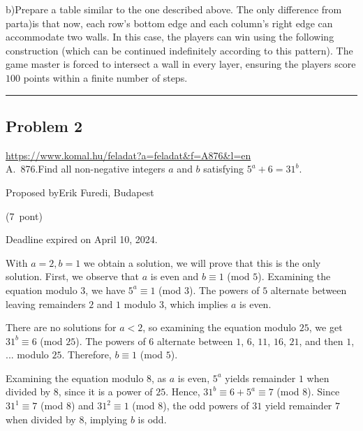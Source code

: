 \documentclass{article}
\begin{document}
b)Prepare a table similar to the one described above. The only difference from parta)is that now, each row's bottom edge and each column's right edge can accommodate two walls. In this case, the players can win using the following construction (which can be continued indefinitely according to this pattern). The game master is forced to intersect a wall in every layer, ensuring the players score \(\displaystyle 100\) points within a finite number of steps.

\vspace{1em}
\hrule
\vspace{1em}

\subsection*{Problem 2}
\noindent\url{https://www.komal.hu/feladat?a=feladat&f=A876&l=en}\\[1em]

A. 876.Find all non-negative integers \(\displaystyle a\) and \(\displaystyle b\) satisfying \(\displaystyle 5^a+6=31^b\).

Proposed byErik Furedi, Budapest

(7 pont)

Deadline expired on April 10, 2024.

With \(\displaystyle a=2, b=1\) we obtain a solution, we will prove that this is the only solution. First, we observe that \(\displaystyle a\) is even and \(\displaystyle b\equiv1\) (mod \(\displaystyle 5\)). Examining the equation modulo \(\displaystyle 3\), we have \(\displaystyle 5^a\equiv1\) (mod \(\displaystyle 3\)). The powers of \(\displaystyle 5\) alternate between leaving remainders \(\displaystyle 2\) and \(\displaystyle 1\) modulo \(\displaystyle 3\), which implies \(\displaystyle a\) is even.

There are no solutions for \(\displaystyle a<2\), so examining the equation modulo \(\displaystyle 25\), we get \(\displaystyle 31^b\equiv6\) (mod \(\displaystyle 25\)). The powers of \(\displaystyle 6\) alternate between \(\displaystyle 1\), \(\displaystyle 6\), \(\displaystyle 11\), \(\displaystyle 16\), \(\displaystyle 21\), and then \(\displaystyle 1\), ... modulo \(\displaystyle 25\). Therefore, \(\displaystyle b\equiv1\) (mod \(\displaystyle 5\)).

Examining the equation modulo \(\displaystyle 8\), as \(\displaystyle a\) is even, \(\displaystyle 5^a\) yields remainder \(\displaystyle 1\) when divided by \(\displaystyle 8\), since it is a power of \(\displaystyle 25\). Hence, \(\displaystyle 31^b\equiv6+5^a\equiv7\) (mod \(\displaystyle 8\)). Since \(\displaystyle 31^1\equiv7\) (mod \(\displaystyle 8\)) and \(\displaystyle 31^{2}\equiv1\) (mod \(\displaystyle 8\)), the odd powers of \(\displaystyle 31\) yield remainder \(\displaystyle 7\) when divided by \(\displaystyle 8\), implying \(\displaystyle b\) is odd.
\end{document}
